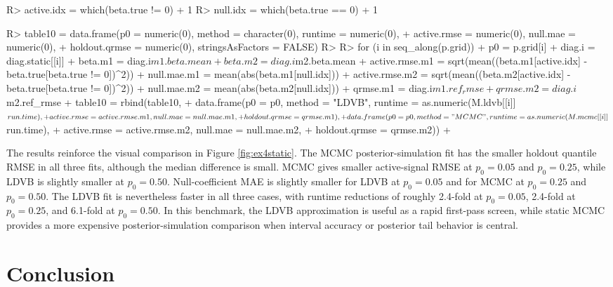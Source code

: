 \documentclass{jss}
\begin{document}
\begin{CodeChunk}
    \begin{CodeInput}
R> active.idx = which(beta.true != 0) + 1   
R> null.idx   = which(beta.true == 0) + 1

R> table10 = data.frame(p0 = numeric(0), method = character(0), runtime = numeric(0),
+                       active.rmse = numeric(0), null.mae = numeric(0),
+                       holdout.qrmse = numeric(0), stringsAsFactors = FALSE)
R> 
R> for (i in seq_along(p.grid)) {
+    p0 = p.grid[i]
+    diag.i = diag.static[[i]]
+    beta.m1 = diag.i$m1.beta.mean
+    beta.m2 = diag.i$m2.beta.mean
+    active.rmse.m1 = sqrt(mean((beta.m1[active.idx] - beta.true[beta.true != 0])^2))
+    null.mae.m1    = mean(abs(beta.m1[null.idx]))
+    active.rmse.m2 = sqrt(mean((beta.m2[active.idx] - beta.true[beta.true != 0])^2))
+    null.mae.m2    = mean(abs(beta.m2[null.idx]))
+    qrmse.m1 = diag.i$m1.ref_rmse
+    qrmse.m2 = diag.i$m2.ref_rmse
+    table10 = rbind(table10,
+                    data.frame(p0 = p0, method = "LDVB", runtime = as.numeric(M.ldvb[[i]]$run.time),
+                               active.rmse = active.rmse.m1, null.mae = null.mae.m1,
+                               holdout.qrmse = qrmse.m1),
+                    data.frame(p0 = p0, method = "MCMC", runtime = as.numeric(M.mcmc[[i]]$run.time),
+                               active.rmse = active.rmse.m2, null.mae = null.mae.m2,
+                               holdout.qrmse = qrmse.m2))
+ }
    \end{CodeInput}
\end{CodeChunk}


The results reinforce the visual comparison in Figure \ref{fig:ex4static}. The MCMC posterior-simulation fit has the smaller holdout quantile RMSE in all three fits, although the median difference is small. MCMC gives smaller active-signal RMSE at \(p_0 = 0.05\) and \(p_0 = 0.25\), while LDVB is slightly smaller at \(p_0 = 0.50\). Null-coefficient MAE is slightly smaller for LDVB at \(p_0 = 0.05\) and for MCMC at \(p_0 = 0.25\) and \(p_0 = 0.50\). The LDVB fit is nevertheless faster in all three cases, with runtime reductions of roughly 2.4-fold at \(p_0 = 0.05\), 2.4-fold at \(p_0 = 0.25\), and 6.1-fold at \(p_0 = 0.50\). In this benchmark, the LDVB approximation is useful as a rapid first-pass screen, while static MCMC provides a more expensive posterior-simulation comparison when interval accuracy or posterior tail behavior is central.

\section{Conclusion}
\label{sec:summary}
\end{document}
